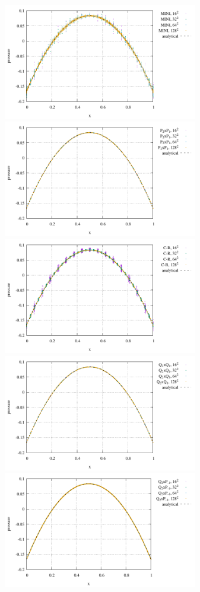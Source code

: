\newpage
\begin{center}
\includegraphics[width=8.5cm]{python_codes/fieldstone_112/results/exp1_rand/pressMINI}
\includegraphics[width=8.5cm]{python_codes/fieldstone_112/results/exp1_rand/pressP2P1}\\
\includegraphics[width=8.5cm]{python_codes/fieldstone_112/results/exp1_rand/pressCR}
\includegraphics[width=8.5cm]{python_codes/fieldstone_112/results/exp1_rand/pressQ2Q1}\\
\includegraphics[width=8.5cm]{python_codes/fieldstone_112/results/exp1_rand/pressQ2P1}\\

\end{center}
